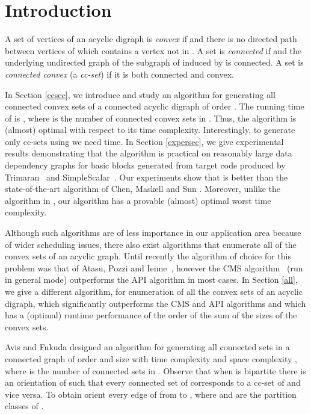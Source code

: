 \documentclass[11pt]{article}
\newcommand{\2}{\vspace{0.2 cm}}
\begin{document}
\section{Introduction}

A set  of vertices of an acyclic digraph  is {\em convex} if
 and there is no directed path between vertices of
 which contains a vertex not in . A set  is {\em connected}
if  and the underlying undirected graph of the
subgraph of  induced by  is connected. A set is {\em connected
convex} (a {\em cc-set}) if it is both connected and convex.


In Section \ref{ccsec}, we introduce and study an algorithm 
for generating all connected convex sets of a connected acyclic
digraph  of order . The running time of  is , where  is the number of connected convex sets in
. Thus, the algorithm is (almost) optimal with respect to its
time complexity. Interestingly, to generate only  cc-sets using
 we need  time. In Section \ref{expersec}, we
give experimental results demonstrating that the algorithm is
practical on reasonably large data dependency graphs for basic
blocks generated from target code produced by
Trimaran~\cite{trimaran} and SimpleScalar~\cite{simplescalar}. Our
experiments show that  is better than the state-of-the-art
algorithm of Chen, Maskell and Sun \cite{chen}. Moreover, unlike the
algorithm in \cite{chen}, our algorithm has a provable (almost)
optimal worst time complexity.

Although such algorithms are of less importance in our application
area because of wider scheduling issues, there also exist algorithms
that enumerate all of the convex sets of an acyclic graph. Until
recently the algorithm of choice for this problem was that of Atasu,
Pozzi and Ienne~\cite{atasu2003, atasu2006}, however the CMS
algorithm~\cite{chen} (run in general mode) outperforms the API
algorithm in most cases. In Section \ref{all}, we give a different
algorithm, for enumeration of all the convex sets of an acyclic
digraph, which significantly outperforms the CMS and API
algorithms and which has a (optimal) runtime performance of the
order of the sum of the sizes of the convex sets.

Avis and Fukuda \cite{avisDAM65} designed an algorithm for
generating all connected sets in a connected graph  of order 
and size  with time complexity  and space
complexity , where  is the number of connected sets in
. Observe that when  is bipartite there is an orientation 
of  such that every connected set of  corresponds to a cc-set
of  and vice versa. To obtain  orient every edge of  from
 to , where  and  are the partition classes of .
\end{document}

